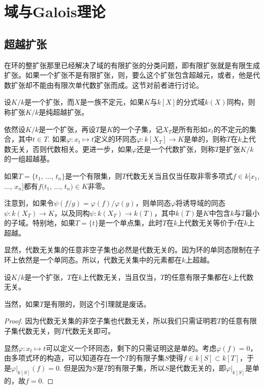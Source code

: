 \chapter{域与Galois理论}
\section{超越扩张}
在环的整扩张那里已经解决了域的有限扩张的分类问题，即有限扩张就是有限生成扩张。如果一个扩张不是有限扩张，则，要么这个扩张包含超越元，或者，他是代数扩张却不能由有限次单代数扩张而成。这节对前者进行讨论。

\begin{para}
设$K/k$是一个扩张，而$X$是一族不定元，如果$K$与$k[X]$的分式域$k(X)$同构，则称扩张$K/k$是纯超越扩张。

依然设$K/k$是一个扩张，再设$T$是$K$的一个子集，记$X_T$是所有形如$x_t$的不定元的集合，其中$t\in T$. 如果$\varphi:x_t\mapsto t$定义的环同态$\varphi:k[X_T]\to K$是单的，则称$T$在$k$上代数无关，否则代数相关。更进一步，如果$\varphi$还是一个代数扩张，则称$T$是扩张$K/k$的一组超越基。
\end{para}

如果$T=\{t_1$, $\dots$, $t_n\}$是一个有限集，则$T$代数无关当且仅当任取非零多项式$f\in k[x_1$, $\dots$, $x_n]$都有$f(t_1$, $\dots$, $t_n)\in K$非零。

注意到，如果令$\psi(f/g)=\varphi(f)/\varphi(g)$，则单同态$\varphi$将诱导域的同态$\psi:k(X_T)\to K$，以及同构$\psi:k(X_T)\to k(T)$，其中$k(T)$是$K$中包含$k$与$T$最小的子域。特别地，如果$T=\{t\}$是一个单点集，此时$T$在$k$上代数无关等价于$t$在$k$上超越。

显然，代数无关集的任意非空子集也必然是代数无关的。因为环的单同态限制在子环上依然是一个单同态。所以，代数无关集中的元素都在$k$上超越。

\begin{lem}
设$K/k$是一个扩张，$T$在$k$上代数无关，当且仅当，$T$的任意有限子集都在$k$上代数无关。
\end{lem}

当然，如果$T$是有限的，则这个引理就是废话。

\begin{proof}
因为代数无关集的非空子集也代数无关，所以我们只需证明若$T$的任意有限子集代数无关，则$T$代数无关即可。

显然$\varphi:x_t\mapsto t$可以定义一个环同态，剩下的只需证明这是单的。考虑$\varphi(f)=0$，由多项式环的构造，可以知道存在一个$T$的有限子集$S$使得$f\in k[S]\subset k[T]$，于是$\varphi|_{k[S]}(f)=0$. 但是因为$S$是$T$的有限子集，所以$S$是代数无关的，即$\varphi|_{k[S]}$是单的，故$f=0$.
\end{proof}

